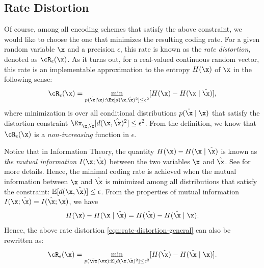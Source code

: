 \documentclass[../../book-main.tex]{subfiles}
\begin{document}
\subsection{Rate Distortion}
Of course, among all encoding schemes that satisfy the above constraint, we would like to choose the one that minimizes the resulting coding rate. For a given random variable $\x$ and a precision $\epsilon$, this rate is known as the {\em rate distortion}, denoted as $\cR_{\epsilon}(\x)$. As it turns out, for a real-valued continuous random vector, this rate is an implementable approximation to the entropy $H(\x)$ of $\x$ in the following sense:
\begin{equation}
	\cR_{\epsilon}(\x) = \min_{p(\hat \x \mid \x): \Ex[d(\x, \hat \x)^{2}] \le \epsilon^{2}} [H(\x) - H(\x \mid \hat{\x})],
    \label{eqn:rate-distortion-general}
\end{equation}
where minimization is over all conditional distributions $p(\hat \x \mid \x)$ that satisfy the distortion constraint $\Ex_{\x, \hat \x}[d(\x, \hat \x)^{2}] \le \epsilon^{2}$. From the definition, we know that $\cR_{\epsilon}(\x)$ is a {\em non-increasing} function in $\epsilon$.

\begin{remark}
	Notice that in Information Theory, the quantity $H(\x) - H(\x \mid \hat \x)$ is known as {\em the mutual information} $I(\x; \hat \x)$ between the two variables $\x$ and $\hat \x$. See \cite{Cover-Thomas} for more details. Hence, the minimal coding rate is achieved when the mutual information between $\x$ and $\hat \x$ is minimized among all distributions that satisfy the constraint: $\mathbb{E} [d(\x, \hat \x)] \le \epsilon$. From the properties of mutual information $I(\x; \hat \x) = I(\hat \x; \x)$, we have  
	\begin{equation}
        H(\x) - H(\x \mid \hat{\x}) = H(\hat\x) - H(\hat\x \mid {\x}).
    \end{equation}
    Hence, the above rate distortion \eqref{eqn:rate-distortion-general} can also be rewritten as:
    \begin{equation}
		\cR_{\epsilon}(\x) = \min_{p(\hat \vx \mid \vx): \mathbb{E} [d(\x, \hat \x)^{2}] \le \epsilon^{2}} [H(\hat \x) - H(\hat \x \mid \x)].  \label{eqn:rate-distortion-general-2}
	\end{equation}
\end{remark}
\end{document}
